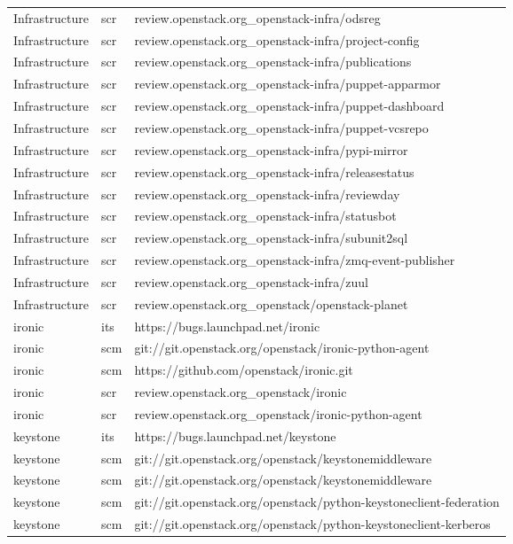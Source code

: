 \begin{center}
\begin{longtable}{|p{4cm}|p{1cm}|p{10cm}|}
Infrastructure&scr&review.openstack.org\_openstack-infra/odsreg\\ 
Infrastructure&scr&review.openstack.org\_openstack-infra/project-config\\ 
Infrastructure&scr&review.openstack.org\_openstack-infra/publications\\ 
Infrastructure&scr&review.openstack.org\_openstack-infra/puppet-apparmor\\ 
Infrastructure&scr&review.openstack.org\_openstack-infra/puppet-dashboard\\ 
Infrastructure&scr&review.openstack.org\_openstack-infra/puppet-vcsrepo\\ 
Infrastructure&scr&review.openstack.org\_openstack-infra/pypi-mirror\\ 
Infrastructure&scr&review.openstack.org\_openstack-infra/releasestatus\\ 
Infrastructure&scr&review.openstack.org\_openstack-infra/reviewday\\ 
Infrastructure&scr&review.openstack.org\_openstack-infra/statusbot\\ 
Infrastructure&scr&review.openstack.org\_openstack-infra/subunit2sql\\ 
Infrastructure&scr&review.openstack.org\_openstack-infra/zmq-event-publisher\\ 
Infrastructure&scr&review.openstack.org\_openstack-infra/zuul\\ 
Infrastructure&scr&review.openstack.org\_openstack/openstack-planet\\ 
ironic&its&https://bugs.launchpad.net/ironic\\ 
ironic&scm&git://git.openstack.org/openstack/ironic-python-agent\\ 
ironic&scm&https://github.com/openstack/ironic.git\\ 
ironic&scr&review.openstack.org\_openstack/ironic\\ 
ironic&scr&review.openstack.org\_openstack/ironic-python-agent\\ 
keystone&its&https://bugs.launchpad.net/keystone\\ 
keystone&scm&git://git.openstack.org/openstack/keystonemiddleware\\ 
keystone&scm&git://git.openstack.org/openstack/keystonemiddleware\\ 
keystone&scm&git://git.openstack.org/openstack/python-keystoneclient-federation\\ 
keystone&scm&git://git.openstack.org/openstack/python-keystoneclient-kerberos\\ 

\end{longtable}
\end{center}
